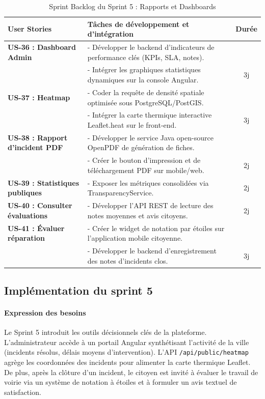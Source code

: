 \begin{table}[H]
    \centering
    \caption{Sprint Backlog du Sprint 5 : Rapports et Dashboards}
    \label{tab:backlog_sprint5}
    \vspace{0.2cm}
    \scriptsize
    \begin{tabularx}{\textwidth}{|l|X|c|}
        \hline
        \textbf{User Stories} & \textbf{Tâches de développement et d'intégration} & \textbf{Durée} \\ \hline
        \textbf{US-36 : Dashboard Admin} & 
        - Développer le backend d'indicateurs de performance clés (KPIs, SLA, notes).\\
        & - Intégrer les graphiques statistiques dynamiques sur la console Angular. & 3j \\ \hline
        \textbf{US-37 : Heatmap} &
        - Coder la requête de densité spatiale optimisée sous PostgreSQL/PostGIS.\\
        & - Intégrer la carte thermique interactive Leaflet.heat sur le front-end. & 3j \\ \hline
        \textbf{US-38 : Rapport d'incident PDF} &
        - Développer le service Java open-source OpenPDF de génération de fiches.\\
        & - Créer le bouton d'impression et de téléchargement PDF sur mobile/web. & 2j \\ \hline
        \textbf{US-39 : Statistiques publiques} &
        - Exposer les métriques consolidées via TransparencyService. & 2j \\ \hline
        \textbf{US-40 : Consulter évaluations} &
        - Développer l'API REST de lecture des notes moyennes et avis citoyens. & 2j \\ \hline
        \textbf{US-41 : Évaluer réparation} &
        - Créer le widget de notation par étoiles sur l'application mobile citoyenne.\\
        & - Développer le backend d'enregistrement des notes d'incidents clos. & 3j \\ \hline
    \end{tabularx}
\end{table}

\subsection{Implémentation du sprint 5}

\paragraph{Expression des besoins}
Le Sprint 5 introduit les outils décisionnels clés de la plateforme. L'administrateur accède à un portail Angular synthétisant l'activité de la ville (incidents résolus, délais moyens d'intervention). L'API \texttt{/api/public/heatmap} agrège les coordonnées des incidents pour alimenter la carte thermique Leaflet. De plus, après la clôture d'un incident, le citoyen est invité à évaluer le travail de voirie via un système de notation à étoiles et à formuler un avis textuel de satisfaction.

